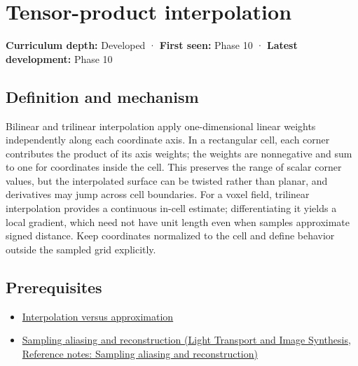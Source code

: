 \hypertarget{appendix-0a09b6dfdc86}{}\label{referencestart:appendix-0a09b6dfdc86}
\section{Tensor-product interpolation}\label{appendix-0a09b6dfdc86-tensor-product-interpolation}

\textbf{Curriculum depth:} Developed · \textbf{First seen:} Phase 10 · \textbf{Latest development:} Phase 10

\begin{allmightroledefinition}

\subsection{Definition and mechanism}\label{appendix-0a09b6dfdc86-definition-and-mechanism}

Bilinear and trilinear interpolation apply one-dimensional linear weights independently along each coordinate axis. In a rectangular cell, each corner contributes the product of its axis weights; the weights are nonnegative and sum to one for coordinates inside the cell. This preserves the range of scalar corner values, but the interpolated surface can be twisted rather than planar, and derivatives may jump across cell boundaries. For a voxel field, trilinear interpolation provides a continuous in-cell estimate; differentiating it yields a local gradient, which need not have unit length even when samples approximate signed distance. Keep coordinates normalized to the cell and define behavior outside the sampled grid explicitly.

\end{allmightroledefinition}

\subsection{Prerequisites}\label{appendix-0a09b6dfdc86-prerequisites}

\begin{itemize}
\tightlist
\item
  \hyperref[appendix-0c2a5f69851e]{Interpolation versus approximation}
\item
  \href{../04-Light-Transport-and-Image-Synthesis/main.pdf\#nameddest=appendix-6a7869dd79a6}{Sampling aliasing and reconstruction (Light Transport and Image Synthesis, Reference notes: Sampling aliasing and reconstruction)}
\end{itemize}

